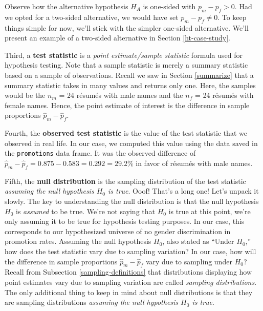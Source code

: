 \documentclass[
]{book}
\begin{document}
Observe how the alternative hypothesis \(H_A\) is one-sided with \(p_{m} - p_{f} > 0\). Had we opted for a two-sided alternative, we would have set \(p_{m} - p_{f} \neq 0\). To keep things simple for now, we'll stick with the simpler one-sided alternative. We'll present an example of a two-sided alternative in Section \ref{ht-case-study}.

Third, a \textbf{test statistic}  is a \emph{point estimate/sample statistic} formula used for hypothesis testing. Note that a sample statistic is merely a summary statistic based on a sample of observations. Recall we saw in Section \ref{summarize} that a summary statistic takes in many values and returns only one. Here, the samples would be the \(n_m\) = 24 résumés with male names and the \(n_f\) = 24 résumés with female names. Hence, the point estimate of interest is the difference in sample proportions \(\widehat{p}_{m} - \widehat{p}_{f}\).

Fourth, the \textbf{observed test statistic}  is the value of the test statistic that we observed in real life. In our case, we computed this value using the data saved in the \texttt{promotions} data frame. It was the observed difference of \(\widehat{p}_{m} -\widehat{p}_{f} = 0.875 - 0.583 = 0.292 = 29.2\%\) in favor of résumés with male names.

Fifth, the \textbf{null distribution}  is the sampling distribution of the test statistic \emph{assuming the null hypothesis \(H_0\) is true}. Ooof! That's a long one! Let's unpack it slowly. The key to understanding the null distribution is that the null hypothesis \(H_0\) is \emph{assumed} to be true. We're not saying that \(H_0\) is true at this point, we're only assuming it to be true for hypothesis testing purposes. In our case, this corresponds to our hypothesized universe of no gender discrimination in promotion rates. Assuming the null hypothesis \(H_0\), also stated as ``Under \(H_0\),'' how does the test statistic vary due to sampling variation? In our case, how will the difference in sample proportions \(\widehat{p}_{m} - \widehat{p}_{f}\) vary due to sampling under \(H_0\)? Recall from Subsection \ref{sampling-definitions} that distributions displaying how point estimates vary due to sampling variation are called \emph{sampling distributions}. The only additional thing to keep in mind about null distributions is that they are sampling distributions \emph{assuming the null hypothesis \(H_0\) is true}.
\end{document}
